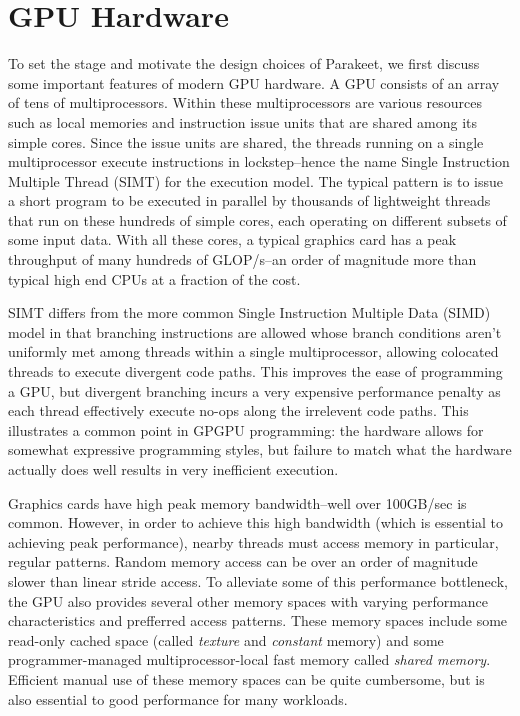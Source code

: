 \documentclass[preprint]{sigplanconf}
\begin{document}
\section{GPU Hardware}
To set the stage and motivate the design choices of Parakeet, we first discuss
some important features of modern GPU hardware.  A GPU consists of an array
of tens of multiprocessors.  Within these multiprocessors are various
resources such as local memories and instruction issue units that are shared
among its simple cores. Since the issue units are shared, the threads running
on a single multiprocessor execute instructions in lockstep--hence the name
Single Instruction Multiple Thread (SIMT) for the execution model.  The typical
pattern is to issue a short program to be executed in parallel by thousands
of lightweight threads that run on these hundreds of simple cores, each
operating on different subsets of some input data.  With all these cores, a
typical graphics card has a peak throughput of many hundreds of GLOP/s--an
order of magnitude more than typical high end CPUs at a fraction of the cost.

SIMT differs from the more common Single Instruction Multiple Data (SIMD) model
in that branching instructions are allowed whose branch conditions aren't
uniformly met among threads within a single multiprocessor, allowing colocated
threads to execute divergent code paths.  This improves the ease of programming
a GPU, but divergent branching incurs a very expensive performance penalty as
each thread effectively execute no-ops along the irrelevent code paths.  This
illustrates a common point in GPGPU programming: the hardware allows for
somewhat expressive programming styles, but failure to match what the hardware
actually does well results in very inefficient execution.

Graphics cards have high peak memory bandwidth--well over 100GB/sec is
common.  However, in order to achieve this high bandwidth (which is essential
to achieving peak performance), nearby threads must access memory in
particular, regular patterns.  Random memory access can be over an order of
magnitude slower than linear stride access.  To alleviate some of this
performance bottleneck, the GPU also provides several other memory spaces with
varying performance characteristics and prefferred access patterns.  These
memory spaces include some read-only cached space (called \emph{texture} and
\emph{constant} memory) and some programmer-managed multiprocessor-local fast
memory called \emph{shared memory}.  Efficient manual use of these memory spaces
can be quite cumbersome, but is also essential to good performance for many
workloads.
\end{document}
